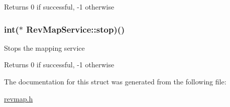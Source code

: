 \begin{DoxyReturn}{\-Returns}
0 if successful, -\/1 otherwise 
\end{DoxyReturn}
\hypertarget{structRevMapService_a3bd47d541130d571de99248bb1e37fb0}{
\subsubsection[{stop}]{\setlength{\rightskip}{0pt plus 5cm}int($\ast$ {\bf \-Rev\-Map\-Service\-::stop})()}}\label{structRevMapService_a3bd47d541130d571de99248bb1e37fb0}
\-Stops the mapping service \begin{DoxyReturn}{\-Returns}
0 if successful, -\/1 otherwise 
\end{DoxyReturn}


\-The documentation for this struct was generated from the following file\-:\begin{DoxyCompactItemize}
\item 
\hyperlink{revmap_8h}{revmap.\-h}\end{DoxyCompactItemize}
